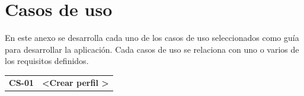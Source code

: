 \chapter{Casos de uso}\label{CasosDeUso}

En este anexo se desarrolla cada uno de los casos de uso seleccionados como guía para desarrollar la aplicación. Cada casos de uso se relaciona con uno o varios de los requisitos definidos.
\begin{table}[htbp]
\centering
\begin{tabular}{ |m{3cm}|m{11cm}|  } 
\hline
\cellcolor[HTML]{B9E3F0}\centering\textbf{CS-01} & \cellcolor[HTML]{B9E3F0}\textbf{\textless Crear perfil \textgreater}\\


\end{tabular}
\end{table}
